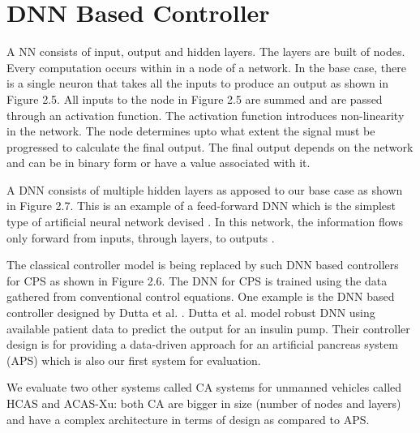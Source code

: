 \section{DNN Based Controller}
\label{apsdnn}


A \ac{NN} consists of input, output and hidden layers. 
The layers are built of nodes. Every computation occurs within in a node of a network.
In the base case, there is a single neuron that takes all the inputs to produce an output as shown in Figure 2.5. 
All inputs to the node in Figure 2.5 are summed and are passed through an activation function. 
The activation function introduces non-linearity in the network. 
The node determines upto what extent the signal must be progressed to calculate the final output. 
The final output depends on the network and can be in binary form or have a value associated with it. 


A \ac{DNN} consists of multiple hidden layers as apposed to our base case  as shown in Figure 2.7.
This is an example of a feed-forward \ac{DNN} which is the simplest type of artificial neural network devised \cite{feedforward}.
In this network, the information flows only forward from inputs, through layers, to outputs \cite{Zell}. 

The classical controller model is being replaced by such DNN based controllers for CPS as shown in  Figure 2.6.
The \ac{DNN} for \ac*{CPS} is trained using the data gathered from conventional control equations. 
One example is the DNN based controller designed by Dutta et al. \cite{Dutta_Others__2018__Robust}. 
Dutta et al. model robust DNN using available patient data to predict the output for an insulin pump.
Their controller design is for providing a data-driven approach for an artificial pancreas system (APS) which is also our first system for evaluation. 

We evaluate two other systems called \ac{CA} systems for unmanned vehicles \cite{7778055} called \ac{HCAS} and \ac{ACAS-Xu}: both \ac{CA} are bigger in size (number of nodes and layers) and have a complex architecture in terms of design as compared to \ac{APS}.


